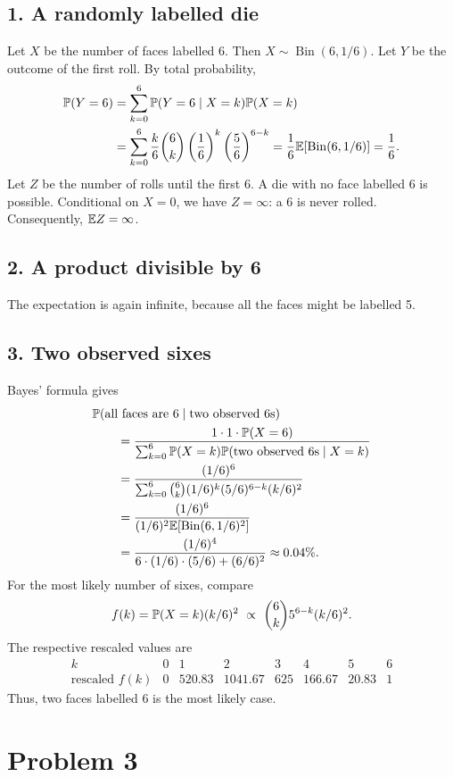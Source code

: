 \documentclass[11pt,a4paper]{article}
\begin{document}
\subsection*{1. A randomly labelled die}
Let $X$ be the number of faces labelled 6. Then $X\sim\operatorname{Bin}(6,1/6)$.
Let $Y$ be the outcome of the first roll. By total probability,
\begin{align*}
\P(Y=6)&=\sum_{k=0}^6\P(Y=6\mid X=k)\P(X=k)\\
&=\sum_{k=0}^6\frac k6\binom6k\left(\frac16\right)^k
\left(\frac56\right)^{6-k}
=\frac16\E[\operatorname{Bin}(6,1/6)]=\frac16.
\end{align*}
Let $Z$ be the number of rolls until the first 6. A die with no face labelled 6 is possible. Conditional on $X=0$, we have $Z=\infty$: a 6 is never rolled. Consequently, $\E Z=\infty$.

\subsection*{2. A product divisible by 6}
The expectation is again infinite, because all the faces might be labelled 5.

\subsection*{3. Two observed sixes}
Bayes' formula gives
\begin{align*}
&\P(\text{all faces are 6}\mid\text{two observed 6s})\\
&\qquad=\frac{1\cdot1\cdot\P(X=6)}
{\sum_{k=0}^6\P(X=k)\P(\text{two observed 6s}\mid X=k)}\\
&\qquad=\frac{(1/6)^6}
{\sum_{k=0}^6\binom6k(1/6)^k(5/6)^{6-k}(k/6)^2}\\
&\qquad=\frac{(1/6)^6}{(1/6)^2\E[\operatorname{Bin}(6,1/6)^2]}\\
&\qquad=\frac{(1/6)^4}{6\cdot(1/6)\cdot(5/6)+(6/6)^2}
\approx0.04\%.
\end{align*}
For the most likely number of sixes, compare
\[
f(k)=\P(X=k)(k/6)^2\ \propto\ \binom6k5^{6-k}(k/6)^2.
\]
The respective rescaled values are
\[
\begin{array}{c|rrrrrrr}
k&0&1&2&3&4&5&6\\\hline
\text{rescaled }f(k)&0&520.83&1041.67&625&166.67&20.83&1
\end{array}
\]
Thus, two faces labelled 6 is the most likely case.

\section*{Problem 3}
\end{document}
